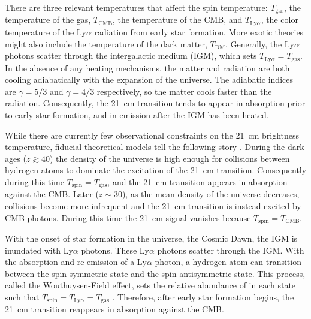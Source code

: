 \begin{bibunit}
There are three relevant temperatures that affect the spin temperature: $T_\text{gas}$, the
temperature of the gas, $T_\text{CMB}$, the temperature of the CMB, and $T_{\text{Ly}\alpha}$, the
color temperature of the Ly$\alpha$ radiation from early star formation. More exotic theories might
also include the temperature of the dark matter, $T_\text{DM}$. Generally,  the Ly$\alpha$ photons
scatter through the intergalactic medium (IGM), which sets $T_{\text{Ly}\alpha} = T_\text{gas}$. In
the absence of any heating mechanisms, the matter and radiation are both cooling adiabatically with
the expansion of the universe.  The adiabatic indices are $\gamma = 5/3$ and $\gamma = 4/3$
respectively, so the matter cools faster than the radiation. Consequently, the 21~cm transition
tends to appear in absorption prior to early star formation, and in emission after the IGM has been
heated.

While there are currently few observational constraints on the 21~cm brightness temperature,
fiducial theoretical models tell the following story \citep{2012RPPh...75h6901P}.  During the dark
ages ($z \gtrsim 40$) the density of the universe is high enough for collisions between hydrogen
atoms to dominate the excitation of the 21~cm transition.  Consequently during this time
$T_\text{spin} = T_\text{gas}$, and the 21~cm transition appears in absorption against the CMB.
Later ($z \sim 30$), as the mean density of the universe decreases, collisions become more
infrequent and the 21~cm transition is instead excited by CMB photons. During this time the 21~cm
signal vanishes because $T_\text{spin} = T_\text{CMB}$.

With the onset of star formation in the universe, the Cosmic Dawn, the IGM is inundated with
Ly$\alpha$ photons.  These Ly$\alpha$ photons scatter through the IGM. With the absorption and
re-emission of a Ly$\alpha$ photon, a hydrogen atom can transition between the spin-symmetric state
and the spin-antisymmetric state. This process, called the Wouthuysen-Field effect, sets the
relative abundance of  in each state such that $T_\text{spin} = T_{\text{Ly}\alpha} =
T_\text{gas}$ \citep{1952AJ.....57R..31W,1958PIRE...46..240F}. Therefore, after early star formation
begins, the 21~cm transition reappears in absorption against the CMB.


\end{bibunit}
